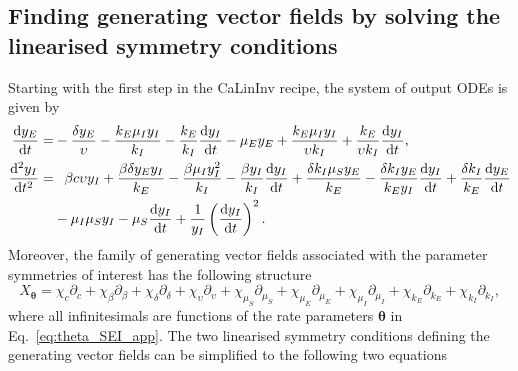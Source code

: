 \documentclass[12pt]{article}
\begin{document}

\subsection{Finding generating vector fields by solving the linearised symmetry conditions}

Starting with the first step in the CaLinInv recipe, the system of output ODEs is given by
\begin{align}
\dfrac{\mathrm{d}y_{E}}{\mathrm{d}t} =&-\frac{\delta y_{E}}{\upsilon} - \frac{k_{E} \mu_{I} y_{I}}{k_{I}} - \frac{k_{E}}{k_{I}}\dfrac{\mathrm{d}y_{I}}{\mathrm{d}t} - \mu_{E} y_{E} + \frac{k_{E} \mu_{I} y_{I}}{\upsilon k_{I}} + \frac{k_{E}}{\upsilon k_{I}}\dfrac{\mathrm{d}y_{I}}{\mathrm{d}t},\label{eq:ODE_y_E_2_app}\\  
\dfrac{\mathrm{d}^{2}y_{I}}{\mathrm{d}t^{2}} =&\textcolor{white}{-}\beta c \upsilon y_{I} + \frac{\beta \delta y_{E} y_{I}}{k_{E}} - \frac{\beta \mu_{I} y_{I}^{2}}{k_{I}} - \frac{\beta y_{I}}{k_{I}}\dfrac{\mathrm{d}y_{I}}{\mathrm{d}t} + \frac{\delta k_{I} \mu_{S} y_{E}}{k_{E}} - \frac{\delta k_{I} y_{E}}{k_{E} y_{I}}\dfrac{\mathrm{d}y_{I}}{\mathrm{d}t} + \frac{\delta k_{I}}{k_{E}}\dfrac{\mathrm{d}y_{E}}{\mathrm{d}t}\nonumber\\
&-\mu_{I} \mu_{S} y_{I} - \mu_{S} \dfrac{\mathrm{d}y_{I}}{\mathrm{d}t} + \frac{1}{y_{I}}\left(\dfrac{\mathrm{d}y_{I}}{\mathrm{d}t}\right)^{2}.\label{eq:ODE_y_I_2_app}
\end{align}
Moreover, the family of generating vector fields associated with the parameter symmetries of interest has the following structure
\begin{equation}
X_{\boldsymbol{\theta}}=\chi_{c}\partial_{c}+\chi_{\beta}\partial_{\beta}+\chi_{\delta}\partial_{\delta}+\chi_{\upsilon}\partial_{\upsilon}+\chi_{\mu_S}\partial_{\mu_S}+\chi_{\mu_E}\partial_{\mu_E}+\chi_{\mu_I}\partial_{\mu_I}+\chi_{k_{E}}\partial_{k_{E}}+\chi_{k_{I}}\partial_{k_{I}},
\label{eq:generator_SEI}
\end{equation}
where all infinitesimals are functions of the rate parameters $\boldsymbol{\theta}$ in Eq.~\eqref{eq:theta_SEI_app}. The two linearised symmetry conditions defining the generating vector fields can be simplified to the following two equations
\end{document}
